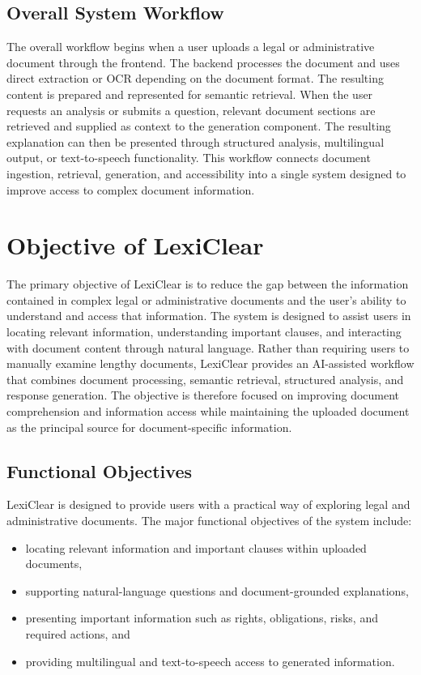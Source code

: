 \documentclass[12pt,a4paper,oneside]{report}
\begin{document}
\subsection{Overall System Workflow}

The overall workflow begins when a user uploads a legal or administrative
document through the frontend. The backend processes the document and uses
direct extraction or OCR depending on the document format. The resulting
content is prepared and represented for semantic retrieval. When the user
requests an analysis or submits a question, relevant document sections are
retrieved and supplied as context to the generation component. The resulting
explanation can then be presented through structured analysis, multilingual
output, or text-to-speech functionality. This workflow connects document
ingestion, retrieval, generation, and accessibility into a single system
designed to improve access to complex document information.

\section{Objective of LexiClear}

The primary objective of LexiClear is to reduce the gap between the
information contained in complex legal or administrative documents and the
user's ability to understand and access that information. The system is
designed to assist users in locating relevant information, understanding
important clauses, and interacting with document content through natural
language. Rather than requiring users to manually examine lengthy documents,
LexiClear provides an AI-assisted workflow that combines document
processing, semantic retrieval, structured analysis, and response
generation. The objective is therefore focused on improving document
comprehension and information access while maintaining the uploaded document
as the principal source for document-specific information.

\subsection{Functional Objectives}

LexiClear is designed to provide users with a practical way of exploring
legal and administrative documents. The major functional objectives of the
system include:

\begin{itemize}
    \item locating relevant information and important clauses within uploaded documents,
    \item supporting natural-language questions and document-grounded explanations,
    \item presenting important information such as rights, obligations, risks, and required actions, and
    \item providing multilingual and text-to-speech access to generated information.
\end{itemize}
\end{document}
